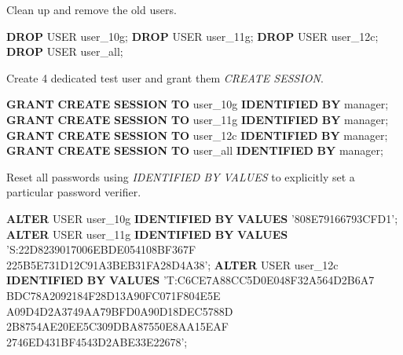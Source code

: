 \documentclass[a4paper,,tablecaptionabove]{scrartcl}
\newenvironment{Shaded}{}{}
\newcommand{\FunctionTok}[1]{\textcolor[rgb]{0.02,0.16,0.49}{#1}}
\newcommand{\KeywordTok}[1]{\textcolor[rgb]{0.00,0.44,0.13}{\textbf{#1}}}
\newcommand{\NormalTok}[1]{#1}
\newcommand{\StringTok}[1]{\textcolor[rgb]{0.25,0.44,0.63}{#1}}
\begin{document}
Clean up and remove the old users.

\begin{Shaded}
\begin{Highlighting}[]
\KeywordTok{DROP} \FunctionTok{USER}\NormalTok{ user_10g;}
\KeywordTok{DROP} \FunctionTok{USER}\NormalTok{ user_11g;}
\KeywordTok{DROP} \FunctionTok{USER}\NormalTok{ user_12c;}
\KeywordTok{DROP} \FunctionTok{USER}\NormalTok{ user_all;}
\end{Highlighting}
\end{Shaded}

Create 4 dedicated test user and grant them \emph{CREATE SESSION}.

\begin{Shaded}
\begin{Highlighting}[]
\KeywordTok{GRANT} \KeywordTok{CREATE} \KeywordTok{SESSION} \KeywordTok{TO}\NormalTok{ user_10g }\KeywordTok{IDENTIFIED} \KeywordTok{BY}\NormalTok{ manager;}
\KeywordTok{GRANT} \KeywordTok{CREATE} \KeywordTok{SESSION} \KeywordTok{TO}\NormalTok{ user_11g }\KeywordTok{IDENTIFIED} \KeywordTok{BY}\NormalTok{ manager;}
\KeywordTok{GRANT} \KeywordTok{CREATE} \KeywordTok{SESSION} \KeywordTok{TO}\NormalTok{ user_12c }\KeywordTok{IDENTIFIED} \KeywordTok{BY}\NormalTok{ manager;}
\KeywordTok{GRANT} \KeywordTok{CREATE} \KeywordTok{SESSION} \KeywordTok{TO}\NormalTok{ user_all }\KeywordTok{IDENTIFIED} \KeywordTok{BY}\NormalTok{ manager;}
\end{Highlighting}
\end{Shaded}

Reset all passwords using \emph{IDENTIFIED BY VALUES} to explicitly set
a particular password verifier.

\begin{Shaded}
\begin{Highlighting}[]
\KeywordTok{ALTER} \FunctionTok{USER}\NormalTok{ user_10g }\KeywordTok{IDENTIFIED} \KeywordTok{BY} \KeywordTok{VALUES} \StringTok{'808E79166793CFD1'}\NormalTok{;}
\KeywordTok{ALTER} \FunctionTok{USER}\NormalTok{ user_11g }\KeywordTok{IDENTIFIED} \KeywordTok{BY} \KeywordTok{VALUES} \StringTok{'S:22D8239017006EBDE054108BF367F}
\StringTok{                                        225B5E731D12C91A3BEB31FA28D4A38'}\NormalTok{;}
\KeywordTok{ALTER} \FunctionTok{USER}\NormalTok{ user_12c }\KeywordTok{IDENTIFIED} \KeywordTok{BY} \KeywordTok{VALUES} \StringTok{'T:C6CE7A88CC5D0E048F32A564D2B6A7}
\StringTok{                                        BDC78A2092184F28D13A90FC071F804E5E}
\StringTok{                                        A09D4D2A3749AA79BFD0A90D18DEC5788D}
\StringTok{                                        2B8754AE20EE5C309DBA87550E8AA15EAF}
\StringTok{                                        2746ED431BF4543D2ABE33E22678'}\NormalTok{;}
\end{Highlighting}
\end{Shaded}
\end{document}

